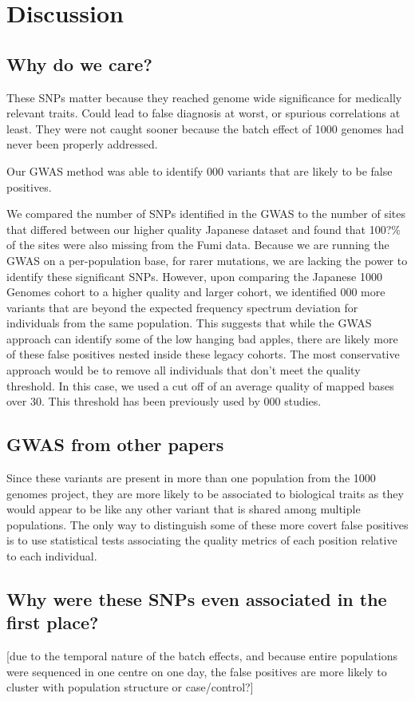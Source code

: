\documentclass[12pt]{amsart}
\begin{document}
			\section{Discussion}
\subsection{Why do we care?}
These SNPs matter because they reached genome wide significance for medically relevant traits. 
Could lead to false diagnosis at worst, or spurious correlations at least. 
They were not caught sooner because the batch effect of 1000 genomes had never been properly addressed. 

Our GWAS method was able to identify 000 variants that are likely to be false positives.

We compared the number of SNPs identified in the GWAS to the number of sites that differed between our higher quality Japanese dataset and found that 100?\% of the sites were also missing from the Fumi data. 
Because we are running the GWAS on a per-population base, for rarer mutations, we are lacking the power to identify these significant SNPs.  
However, upon comparing the Japanese 1000 Genomes cohort to a higher quality and larger cohort, we identified 000 more variants that are beyond the expected frequency spectrum deviation for individuals from the same population. 
This suggests that while the GWAS approach can identify some of the low hanging bad apples, there are likely more of these false positives nested inside these legacy cohorts. 
The most conservative approach would be to remove all individuals that don't meet the quality threshold. 
In this case, we used a cut off of an average quality of mapped bases over 30. This threshold has been previously used by 000 studies.

\subsection{GWAS from other papers}
Since these variants are present in more than one population from the 1000 genomes project, they are more likely to be associated to biological traits as they would appear to be like any other variant that is shared among multiple populations. 
The only way to distinguish some of these more covert false positives is to use statistical tests associating the quality metrics of each position relative to each individual. 
\subsection{Why were these SNPs even associated in the first place?}
[due to the temporal nature of the batch effects, and because entire populations were sequenced in one centre on one day, the false positives are more likely to cluster with population structure or case/control?]
\end{document}

